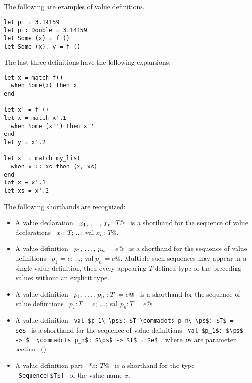 \example The following are examples of value definitions. 
\begin{lstlisting}
let pi = 3.14159
let pi: Double = 3.14159
let Some (x) = f () 
let Some (x), y = f ()
\end{lstlisting}

The last three definitions have the following expansions:
\begin{lstlisting}[escapechar=@]
let x = match f()
  when Some(x) then x
end

let x' = f ()
let x = match x'.1
  when Some (x'') then x''
end
let y = x'.2

let x' = match my_list
  when x :: xs then (x, xs)
end
let x = x'.1
let xs = x'.2
\end{lstlisting}

The following shorthands are recognized: 
\begin{itemize}
  \item[] A value declaration ~\lstinline@let $x_1 ,\, \ldots ,\, x_n$: $T$@~ is a shorthand for the sequence of value declarations ~\lstinline@val $x_1$: $T$; $\ldots$; val $x_n$: $T$@. 

  \item[] A value definition ~\lstinline@val $p_1 ,\, \ldots ,\, p_n$ = $e$@~ is a shorthand for the sequence of value definitions ~\lstinline@val $p_1$ = $e$; $\ldots$; val $p_n$ = $e$@. Multiple such sequences may appear in a single value definition, then every appearing $T$ defined type of the preceding values without an explicit type. 

  \item[] A value definition ~\lstinline@val $p_1 ,\, \ldots ,\, p_n: T$ = $e$@~ is a shorthand for the sequence of value definitions ~\lstinline@val $p_1: T$ = $e$; $\ldots$; val $p_n: T$ = $e$@.

  \item[] A value definition ~\lstinline!val $p_1\ \ps$: $T \commadots p_n\ \ps$: $T$ = $e$!~ is a shorthand for the sequence of value definitions ~\lstinline!val $p_1$: $\ps$ -> $T \commadots p_n$: $\ps$ -> $T$ = $e$!~, where $\mbox{\sl ps}$ are parameter sections ().

  \item[] A value definition part ~\lstinline@*$x$: $T$@~ is a shorthand for the type ~\lstinline!Sequence[$T$]!~ of the value name $x$. 
\end{itemize}






